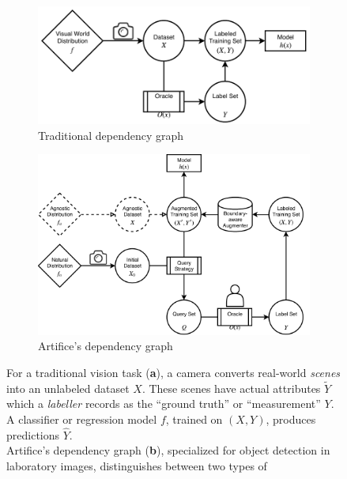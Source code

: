 \documentclass[twocolumn, 10pt]{asme2ej}
\begin{document}
\begin{figure}
  \centering
  \begin{subfigure}{0.4\linewidth}
    \includegraphics[width=\columnwidth]{traditional_graph}
    \caption{Traditional dependency graph}
    \label{fig:general-graph}
  \end{subfigure}
  \hspace{0.1\linewidth}
  \begin{subfigure}{0.4\linewidth}
    \includegraphics[width=\columnwidth]{artifice_graph}
    \caption{Artifice's dependency graph}
    \label{fig:artifice-graph}
  \end{subfigure}
  \caption{For a traditional vision task (\textbf{a}), a camera converts
    real-world \textit{scenes} into an unlabeled dataset $X$. These scenes have
    actual attributes $\tilde{Y}$ which a \textit{labeller} records as the
    ``ground truth'' or ``measurement'' $Y$. A classifier or regression model
    $f$, trained on $(X,Y)$, produces predictions $\hat{Y}$.\\
    Artifice's dependency graph (\textbf{b}), specialized for object detection
    in laboratory images, distinguishes between two types of
}
\end{figure}
\end{document}
